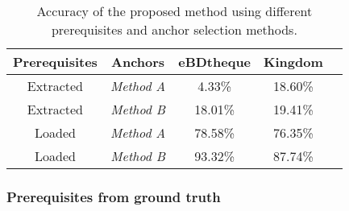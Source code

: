 \documentclass[conference]{IEEEtran}
\begin{document}


  \begin{table}[t]
    \normalsize

    \centering
    \caption{Accuracy of the proposed method using different prerequisites and anchor selection methods.}
    \begin{tabular}{|c|c|c|c|c|}
          \hline
        Prerequisites & Anchors & eBDtheque  & Kingdom     \\
        \hline
        Extracted & \emph{Method A}   & 4.33\%   & 18.60\% \\
        \hline
        Extracted & \emph{Method B}   & 18.01\%   & 19.41\% \\
        \hline
        Loaded    & \emph{Method A}   & 78.58\%   & 76.35\% \\
        \hline
        Loaded    & \emph{Method B}   & 93.32\%   & 87.74\% \\
        \hline
        \end{tabular}
    \label{tab:performance_auto}
  \end{table}%



\subsubsection{Prerequisites from ground truth} %
\label{ssub:prerequiste_loaded_from_ground_truth}

\end{document}

